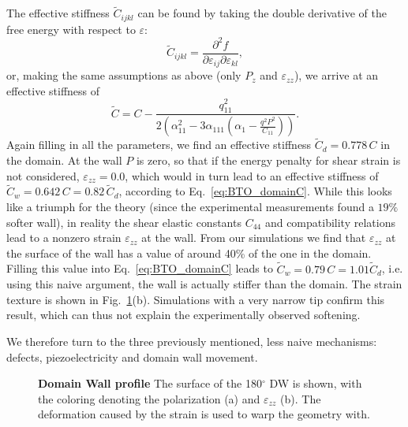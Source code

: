 The effective stiffness $\tilde{C}_{ijkl}$ can be found by taking the double derivative of the free energy with respect to $\varepsilon$:
\begin{equation}
	\tilde{C}_{ijkl} = \frac{\partial^2 f}{\partial \varepsilon_{ij} \partial \varepsilon_{kl}},
\end{equation}
or, making the same assumptions as above (only $P_z$ and $\varepsilon_{zz}$), we arrive at an effective stiffness of
\begin{equation}
	\label{eq:BTO_domainC}
	\tilde{C} = C - \frac{q_{11}^2}{2\left(\alpha_{11}^2 - 3 \alpha_{111}\left(\alpha_1  - \frac{q^2 P^2}{C_{11}}\right)\right)}.
\end{equation}
Again filling in all the parameters, we find an effective stiffness $\tilde{C}_d = 0.778 \,C$ in the domain.
At the wall $P$ is zero, so that if the energy penalty for shear strain is not considered, $\varepsilon_{zz} = 0.0$, which would in turn lead to an effective stiffness of $\tilde{C}_w = 0.642 \, C = 0.82\, \tilde{C}_d$, according to Eq.~\ref{eq:BTO_domainC}.
While this looks like a triumph for the theory (since the experimental measurements found a $19\%$ softer wall), in reality the shear elastic constants $C_{44}$ and compatibility relations lead to a nonzero strain $\varepsilon_{zz}$ at the wall.
From our simulations we find that $\varepsilon_{zz}$ at the surface of the wall has a value of around 40\% of the one in the domain.
Filling this value into Eq.~\ref{eq:BTO_domainC} leads to $\tilde{C}_w = 0.79 \, C = 1.01 \tilde{C}_d$, i.e. using this naive argument, the wall is actually stiffer than the domain.
The strain texture is shown in Fig.~\ref{fig:BTO_wall}(b).
Simulations with a very narrow tip confirm this result, which can thus not explain the experimentally observed softening.

We therefore turn to the three previously mentioned, less naive mechanisms: defects, piezoelectricity and domain wall movement.

\begin{figure}[h]
	\caption{\label{fig:BTO_wall} {\bf Domain Wall profile} The surface of the 180$^\circ$ DW is shown, with the coloring denoting the polarization (a) and $\varepsilon_{zz}$ (b). The deformation caused by the strain is used to warp the geometry with.}
\end{figure}

